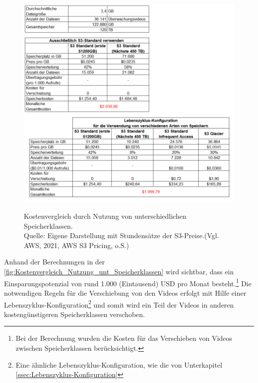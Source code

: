 \begin{figure}[h!]
  \centering
  \includegraphics[scale=0.7]{sources/Kostenvergleich_Nutzung_unt_Speicherklassen}
  \caption[Kostenvergleich durch Nutzung von unterschiedlichen Speicherklassen]{}\label{fig:Kostenvergleich_Nutzung_unt_Speicherklassen} 
  Kostenvergleich durch Nutzung von unterschiedlichen Speicherklassen. \\ 
  Quelle: Eigene Darstellung mit Stundensätze der S3-Preise.(Vgl. AWS, 2021, AWS S3 Pricing, o.S.\cite{AMZ09})
\end{figure}
\begin{flushleft}
Anhand der Berechnungen in der \autoref{fig:Kostenvergleich_Nutzung_unt_Speicherklassen} wird sichtbar, dass ein Einsparungspotenzial von rund 1.000 (Eintausend) USD pro Monat besteht.\footnote{Bei der Berechnung wurden die Kosten für das Verschieben von Videos zwischen Speicherklassen berücksichtigt.} Die notwendigen Regeln für die Verschiebung von den Videos erfolgt mit Hilfe einer Lebenszyklus-Konfiguration\footnote{Eine ähnliche Lebenszyklus-Konfiguration, wie die von Unterkapitel \ref{ssec:Lebenszyklus-Konfiguration}} und somit wird ein Teil der Videos in anderen kostengünstigeren Speicherklassen verschoben.
\end{flushleft}
\newpage
